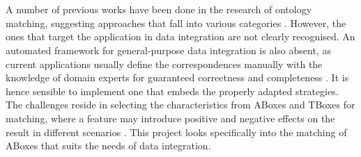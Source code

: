 \documentclass[a4paper,12pt,twoside]{article}
\begin{document}
\\\\
A number of previous works have been done in the research of ontology matching, suggesting approaches that fall into various categories \cite{shvaiko2007ontology}. However, the ones that target the application in data integration are not clearly recognised. An automated framework for general-purpose data integration is also absent, as current applications usually define the correspondences manually with the knowledge of domain experts for guaranteed correctness and completeness \cite{cruz2012interactive}. It is hence sensible to implement one that embeds the properly adapted strategies. The challenges reside in selecting the characteristics from ABoxes and TBoxes for matching, where a feature may introduce positive and negative effects on the result in different scenarios \cite{shvaiko2011ontology}. This project looks specifically into the matching of ABoxes that suits the needs of data integration.





\end{document}
